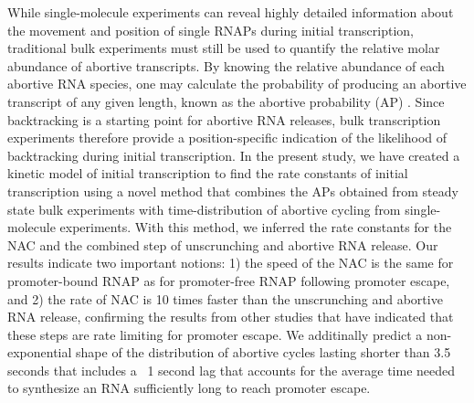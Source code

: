 While single-molecule experiments can reveal highly detailed information
about the movement and position of single RNAPs during initial transcription,
traditional bulk experiments must still be used to quantify the relative molar
abundance of abortive transcripts. By knowing the relative abundance of each
abortive RNA species, one may calculate the probability of producing an
abortive transcript of any given length, known as the abortive probability
(AP) \cite{hsu_promoter_2002, hsu_quantitative_1996}. Since backtracking is a
starting point for abortive RNA releases, bulk transcription experiments
therefore provide a position-specific indication of the likelihood of
backtracking during initial transcription. In the present study, we have
created a kinetic model of initial transcription to find the rate constants of
initial transcription using a novel method that combines the APs obtained from
steady state bulk experiments with time-distribution of abortive cycling from
single-molecule experiments. With this method, we inferred the rate constants
for the NAC and the combined step of unscrunching and abortive RNA release.
Our results indicate two important notions: 1) the speed of the NAC is the
same for promoter-bound RNAP as for promoter-free RNAP following promoter
escape, and 2) the rate of NAC is 10 times faster than the unscrunching and
abortive RNA release, confirming the results from other studies that have
indicated that these steps are rate limiting for promoter escape. We
additinally predict a non-exponential shape of the distribution of abortive
cycles lasting shorter than 3.5 seconds that includes a ~1 second lag that
accounts for the average time needed to synthesize an RNA sufficiently long to
reach promoter escape.
